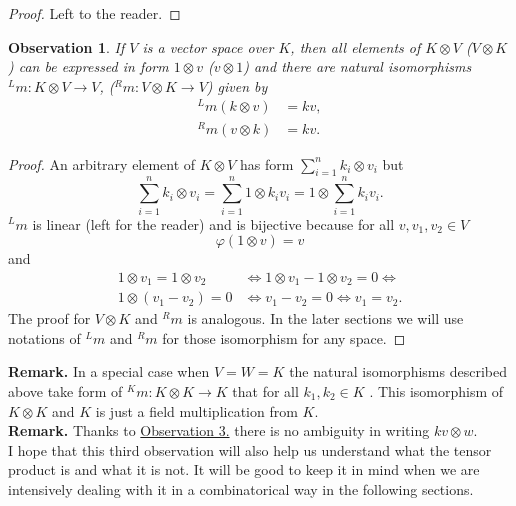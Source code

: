 \documentclass[a4paper, 12pt]{report}
\newtheorem{observation}{Observation}
\begin{document}
\begin{proof}
Left to the reader.
\end{proof}
\begin{observation}\label{observation:5}
If $V$ is a vector space over $K$, then all elements of $K \otimes V$ ($V \otimes K$) can be expressed in
form $1 \otimes v$ ($v \otimes 1$) and there are natural isomorphisms ${^Lm} : K \otimes V \to V$,
(${^Rm} : V \otimes K \to V$) given by
\begin{align*}
{^Lm}(k \otimes v) &= kv, \\
{^Rm}(v \otimes k) &= kv.
\end{align*}
\end{observation}
\begin{proof}
An arbitrary element of $K \otimes V$ has form $\displaystyle\sum^n_{i=1}k_i \otimes v_i$ but
\begin{equation*}
\sum^n_{i=1}k_i \otimes v_i = \sum^n_{i=1} 1 \otimes k_iv_i = 1 \otimes \sum^n_{i=1}k_iv_i.
\end{equation*}
${^Lm}$ is linear (left for the reader) and is bijective because for all $v, v_1, v_2 \in V$
\begin{equation*}
\varphi(1 \otimes v) = v
\end{equation*}
and
\begin{align*}
1 \otimes v_1 = 1 \otimes v_2 &\iff 1 \otimes v_1 - 1 \otimes v_2 = 0 \iff \\
1 \otimes (v_1 - v_2) = 0 &\iff v_1 -v_2 = 0 \iff v_1 = v_2.
\end{align*}
The proof for $V \otimes K$ and ${^Rm}$ is analogous. In the later sections we will use notations of
${^Lm}$ and ${^Rm}$ for those isomorphism for any space.
\end{proof}
\textbf{Remark. } In a special case when $V = W = K$ the natural isomorphisms described above
take form of ${^Km} : K \otimes K \to K$ that for all $k_1, k_2\in K$
. This isomorphism of $K \otimes K$ and $K$ is just a field
multiplication from $K$. \\[8pt]
\noindent \textbf{Remark. } Thanks to \hyperref[observation:3]{Observation 3.} there is no ambiguity in
writing
$kv \otimes w$. \\
I hope that this third observation will also help us understand what the tensor product is and what it is
 not.
It will be good to keep it in mind when we are intensively dealing with it in a combinatorical way in
the following sections.
\end{document}
